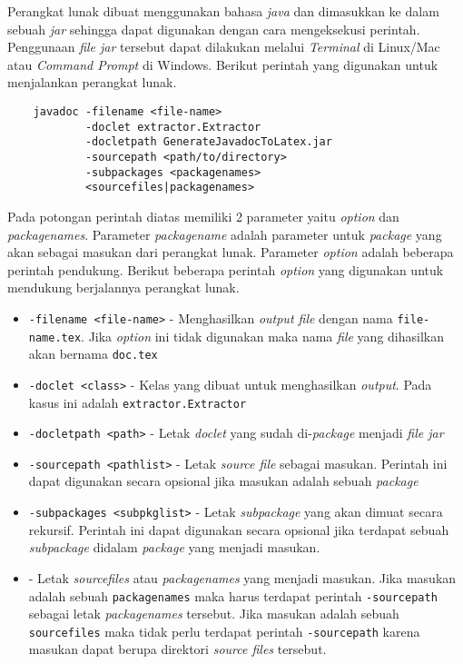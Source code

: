 Perangkat lunak dibuat menggunakan bahasa {\it java} dan dimasukkan ke dalam sebuah {\it jar} sehingga dapat digunakan dengan cara mengeksekusi perintah. Penggunaan {\it file jar} tersebut dapat dilakukan melalui {\it Terminal} di Linux/Mac atau {\it Command Prompt} di Windows. Berikut perintah yang digunakan untuk menjalankan perangkat lunak.
\begin{verbatim}
	javadoc -filename <file-name>
	        -doclet extractor.Extractor
	        -docletpath GenerateJavadocToLatex.jar
	        -sourcepath <path/to/directory>
	        -subpackages <packagenames>
	        <sourcefiles|packagenames>
\end{verbatim}
Pada potongan perintah diatas memiliki 2 parameter yaitu {\it option} dan {\it packagenames}. Parameter {\it packagename} adalah parameter untuk {\it package} yang akan sebagai masukan dari perangkat lunak. Parameter {\it option} adalah beberapa perintah pendukung. Berikut beberapa perintah {\it option} yang digunakan untuk mendukung berjalannya perangkat lunak.
\begin{itemize}
	\item {\tt -filename <file-name>} - Menghasilkan {\it output file} dengan nama {\tt file-name.tex}. Jika {\it option} ini tidak digunakan maka nama {\it file} yang dihasilkan akan bernama {\tt doc.tex}
	\item {\tt -doclet <class>} - Kelas yang dibuat untuk menghasilkan {\it output}. Pada kasus ini adalah {\tt extractor.Extractor}
	\item {\tt -docletpath <path>} - Letak {\it doclet} yang sudah di-{\it package} menjadi {\it file jar}
	\item {\tt -sourcepath <pathlist>} - Letak {\it source file} sebagai masukan. Perintah ini dapat digunakan secara opsional jika masukan adalah sebuah {\it package}
	\item {\tt -subpackages <subpkglist>} - Letak {\it subpackage} yang akan dimuat secara rekursif. Perintah ini dapat digunakan secara opsional jika terdapat sebuah {\it subpackage} didalam {\it package} yang menjadi masukan.
	\item {\tt <sourcefiles|packagenames>} - Letak {\it sourcefiles} atau {\it packagenames} yang menjadi masukan. Jika masukan adalah sebuah {\tt packagenames} maka harus terdapat perintah {\tt -sourcepath} sebagai letak {\it packagenames} tersebut. Jika masukan adalah sebuah {\tt sourcefiles} maka tidak perlu terdapat perintah {\tt -sourcepath} karena masukan dapat berupa direktori {\it source files} tersebut.
\end{itemize}

